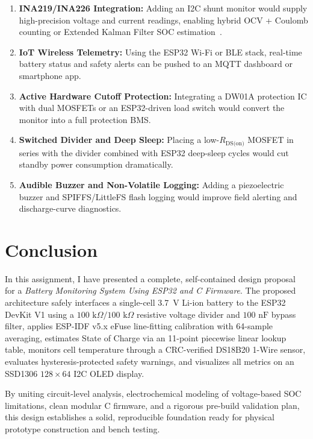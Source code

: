 \documentclass[12pt,a4paper]{article}
\begin{document}
\begin{enumerate}
    \item \textbf{INA219/INA226 Integration:} Adding an I2C shunt monitor would supply high-precision voltage and current readings, enabling hybrid OCV + Coulomb counting or Extended Kalman Filter SOC estimation~\cite{plett_bms2}.
    \item \textbf{IoT Wireless Telemetry:} Using the ESP32 Wi-Fi or BLE stack, real-time battery status and safety alerts can be pushed to an MQTT dashboard or smartphone app.
    \item \textbf{Active Hardware Cutoff Protection:} Integrating a DW01A protection IC with dual MOSFETs or an ESP32-driven load switch would convert the monitor into a full protection BMS.
    \item \textbf{Switched Divider and Deep Sleep:} Placing a low-$R_{\text{DS(on)}}$ MOSFET in series with the divider combined with ESP32 deep-sleep cycles would cut standby power consumption dramatically.
    \item \textbf{Audible Buzzer and Non-Volatile Logging:} Adding a piezoelectric buzzer and SPIFFS/LittleFS flash logging would improve field alerting and discharge-curve diagnostics.
\end{enumerate}

\section{Conclusion}
\label{sec:conclusion}

In this assignment, I have presented a complete, self-contained design proposal for a \textit{Battery Monitoring System Using ESP32 and C Firmware}. The proposed architecture safely interfaces a single-cell 3.7~V Li-ion battery to the ESP32 DevKit V1 using a $100\text{ k}\Omega / 100\text{ k}\Omega$ resistive voltage divider and $100\text{ nF}$ bypass filter, applies ESP-IDF v5.x eFuse line-fitting calibration with 64-sample averaging, estimates State of Charge via an 11-point piecewise linear lookup table, monitors cell temperature through a CRC-verified DS18B20 1-Wire sensor, evaluates hysteresis-protected safety warnings, and visualizes all metrics on an SSD1306 $128 \times 64$ I2C OLED display.

By uniting circuit-level analysis, electrochemical modeling of voltage-based SOC limitations, clean modular C firmware, and a rigorous pre-build validation plan, this design establishes a solid, reproducible foundation ready for physical prototype construction and bench testing.
\end{document}

